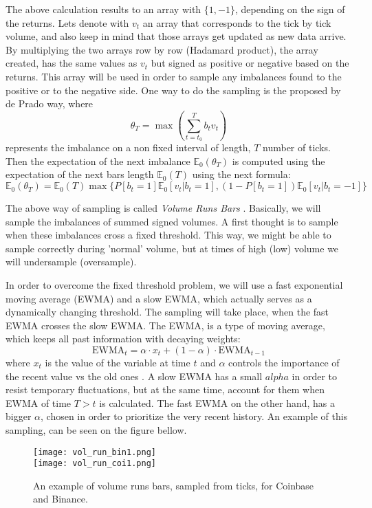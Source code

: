 The above calculation results to an array with \(\{1,-1\}\), depending on the sign of the returns. Lets denote with \( v_t \) an array that corresponds to the tick by tick volume, and also keep in mind that those arrays get updated as new data arrive. By multiplying the two arrays row by row (Hadamard product), the array created, has the same values as \( v_t \) but signed as positive or negative based on the returns. This array will be used in order to sample any imbalances found to the positive or to the negative side. One way to do the sampling is the proposed by de Prado way, where 
\[ \theta_T = \max(\sum_{t = t_0}^{T} b_tv_t) \]
represents the imbalance on a non fixed interval of length, \(T\) number of ticks. Then the expectation of the next imbalance \( \mathbb{E}_0(\theta_T) \) is computed using the expectation of the next bars length \( \mathbb{E}_0(T) \) using the next formula:
\[ \mathbb{E}_0(\theta_T) = \mathbb{E}_0(T) \max\{P[b_t=1]\mathbb{E}_0[v_t|b_t=1], (1-P[b_t=1])\mathbb{E}_0[v_t|b_t=-1]\} \]

The above way of sampling is called \textit{Volume Runs Bars} \cite{marcos}. Basically, we will sample the imbalances of summed signed volumes. A first thought is to sample when these imbalances cross a fixed threshold. This way, we might be able to sample correctly during 'normal' volume, but at times of high (low) volume we will undersample (oversample). 

In order to overcome the fixed threshold problem, we will use a fast exponential moving average (EWMA) and a slow EWMA, which actually serves as a dynamically changing threshold. The sampling will take place, when the fast EWMA crosses the slow EWMA. The EWMA, is a type of moving average, which keeps all past information with decaying weights:
\[ \text{EWMA}_t = \alpha \cdot x_t + (1 - \alpha) \cdot \text{EWMA}_{t-1} \]
 where \(x_t\) is the value of the variable at time \(t\) and \(\alpha\) controls the importance of the recent value vs the old ones \cite{prod}. A slow EWMA has a small \(alpha\) in order to resist temporary fluctuations, but at the same time, account for them when EWMA of time \(T > t\) is calculated. The fast EWMA on the other hand, has a bigger \(\alpha\), chosen in order to prioritize the  very recent history. An example of this sampling, can be seen on the figure bellow.


\begin{figure}[H]
	\centering
    \texttt{[image: vol\_run\_bin1.png]} \\
    \texttt{[image: vol\_run\_coi1.png]}
	\caption{An example of volume runs bars, sampled from ticks, for Coinbase and Binance.}
    \label{fig:vol_run}
\end{figure}

